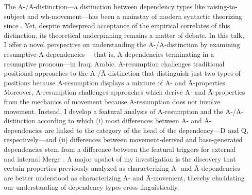 \onehalfspacing The A-/Ā-distinction—a distinction between dependency types like raising-to-subject and wh-movement—has been a mainstay of modern syntactic theorizing since \textcite{chomsky1981LecturesGovernmentBinding, safir2019DistinctionEpiphenomenon}. Yet, despite widespread acceptance of the empirical correlates of this distinction, its theoretical underpinning remains a matter of debate. In this talk, I offer a novel perspective on understanding the A-/Ā-distinction by examining resumptive A-dependencies--- that is, A-dependencies terminating in a resumptive pronoun---in Iraqi Arabic. A-resumption challenges traditional positional approaches to the A-/Ā-distinction that distinguish just two types of positions \parencite[i.e. A vs. Ā; see e.g.][]{chomsky1981LecturesGovernmentBinding, mahajan1990AbarDistinctionMovementa} because A-resumption displays a mixture of A- and Ā-properties. Moreover, A-resumption challenges approaches which derive A- and Ā-properties from the mechanics of movement \parencite[see e.g.][]{vanurk2015UniformSyntaxPhrasal} because A-resumption does not involve movement. Instead, I develop a featural analysis of A-resumption and the A-/Ā-distinction according to which (i) most differences between A- and Ā-dependencies are linked to the category of the head of the dependency—D and Q, respectively—and (ii) differences between movement-derived and base-generated dependencies stem from a difference between the featural triggers for external and internal Merge \parencite[building on][]{hewettTypesResumptiveADependencies}. A major upshot of my investigation is the discovery that certain properties previously analyzed as characterizing A- and Ā-dependencies are better understood as characterizing A- and Ā-movement, thereby elucidating our understanding of dependency types cross-linguistically.